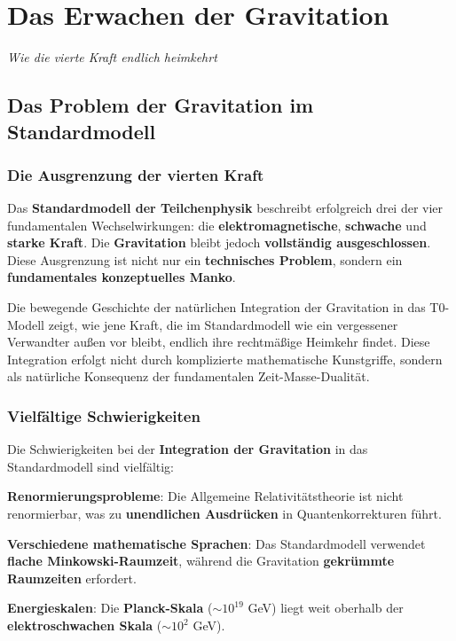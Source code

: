 \documentclass[12pt,a4paper]{report}
\begin{document}
	\chapter{Das Erwachen der Gravitation}
\textit{Wie die vierte Kraft endlich heimkehrt}

\section{Das Problem der Gravitation im Standardmodell}

\subsection{Die Ausgrenzung der vierten Kraft}

Das \textbf{Standardmodell der Teilchenphysik} beschreibt erfolgreich drei der vier fundamentalen Wechselwirkungen: die \textbf{elektromagnetische}, \textbf{schwache} und \textbf{starke Kraft}. Die \textbf{Gravitation} bleibt jedoch \textbf{vollständig ausgeschlossen}. Diese Ausgrenzung ist nicht nur ein \textbf{technisches Problem}, sondern ein \textbf{fundamentales konzeptuelles Manko}.

Die bewegende Geschichte der natürlichen Integration der Gravitation in das T0-Modell zeigt, wie jene Kraft, die im Standardmodell wie ein vergessener Verwandter außen vor bleibt, endlich ihre rechtmäßige Heimkehr findet. Diese Integration erfolgt nicht durch komplizierte mathematische Kunstgriffe, sondern als natürliche Konsequenz der fundamentalen Zeit-Masse-Dualität.

\subsection{Vielfältige Schwierigkeiten}

Die Schwierigkeiten bei der \textbf{Integration der Gravitation} in das Standardmodell sind vielfältig:

\textbf{Renormierungsprobleme}: Die Allgemeine Relativitätstheorie ist nicht renormierbar, was zu \textbf{unendlichen Ausdrücken} in Quantenkorrekturen führt.

\textbf{Verschiedene mathematische Sprachen}: Das Standardmodell verwendet \textbf{flache Minkowski-Raumzeit}, während die Gravitation \textbf{gekrümmte Raumzeiten} erfordert.

\textbf{Energieskalen}: Die \textbf{Planck-Skala} ($\sim 10^{19}$ GeV) liegt weit oberhalb der \textbf{elektroschwachen Skala} ($\sim 10^2$ GeV).
\end{document}
